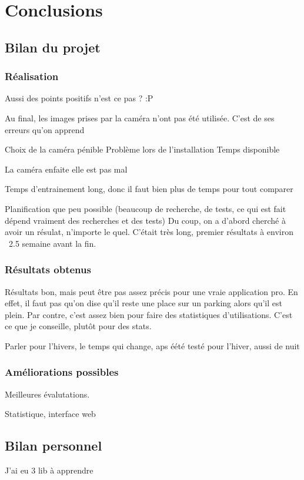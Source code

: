 \chapter{Conclusions}
\section{Bilan du projet}
\subsection{Réalisation}



Aussi des points positifs n'est ce pas ? :P

Au final, les images prises par la caméra n'ont pas été utilisée.
C'est de ses erreurs qu'on apprend

Choix de la caméra pénible
Problème lors de l'installation
Temps disponible

La caméra enfaite elle est pas mal

Temps d'entrainement long, donc il faut bien plus de temps pour tout comparer

Planification que peu possible (beaucoup de recherche, de tests, ce qui est fait dépend vraiment des recherches et des tests) Du coup, on a d'abord cherché à avoir un résulat, n'importe le quel. C'était très long, premier résultats à environ ~2.5 semaine avant la fin.




\subsection{Résultats obtenus}

Résultats bon, mais peut être pas assez précis pour une vraie application pro. En effet, il faut pas qu'on dise qu'il reste une place sur un parking alors qu'il est plein. Par contre, c'est assez bien pour faire des statistiques d'utilisations. C'est ce que je conseille, plutôt pour des stats.

Parler pour l'hivers, le temps qui change, aps éété testé pour l'hiver, aussi de nuit

\subsection{Améliorations possibles}

Meilleures évalutations. 

Statistique, interface web
\section{Bilan personnel}


J'ai eu 3 lib à apprendre
